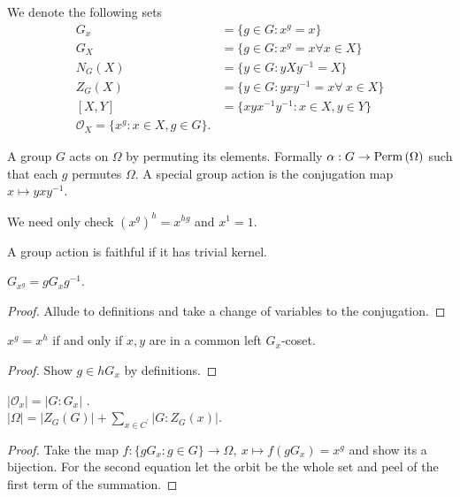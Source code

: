 \begin{definition}
	We denote the following sets
	\begin{align*}
		G_{x} &= \{g \in G :  x^{g} = x  \} \\
		G_{X} &= \{g \in G : x^{g} = x \forall x \in X\}  \\
		N_{G}\left( X \right) &= \{y\in G : yXy^{-1} = X \}  \\
		Z_{G}\left( X \right) &= \{y \in G : yxy^{-1} = x  \forall \ x \in X\}  \\
		\left[ X, Y \right] &= \{xyx^{-1}y^{-1} : x \in X, y \in Y\}  \\
		\mathscr{O}_{X} = \{x^{g} : x \in X, g \in G\}
	.\end{align*}

\end{definition}
\begin{definition}
	A group \(G\) acts on \(\Omega\) by permuting its elements. Formally \(\alpha : G \to \operatorname{Perm} \left( \Omega \right) \) such that each \(g\) permutes \(\Omega\). A special group action is the conjugation map \(x \mapsto yxy^{-1}\).
\end{definition}
\begin{remark}
	We need only check \(\left( x^{g} \right)^{h} = x^{hg} \) and \(x^{1} = 1\).
\end{remark}
\begin{definition}
	A group action is faithful if it has trivial kernel.
\end{definition}
\begin{theorem}
	\(G_{x^{g}} = gG_{x}g^{-1} \).
\end{theorem}
\begin{proof}
	Allude to definitions and take a change of variables to the conjugation.
\end{proof}
\begin{theorem}
	\(x^{g} = x^{h}\) if and only if \(x, y\) are in a common left \(G_{x}\)-coset.
\end{theorem}
\begin{proof}
	Show \(g \in hG_{x}\) by definitions.
\end{proof}
\begin{theorem}
\(\left| \mathscr{O}_{x} \right|  = \left| G : G_{x} \right| \) .\\
\(\left| \Omega \right|  = \left| Z_{G}\left( G \right)  \right|  + \sum_{x \in C^{\prime}}^{} \left| G : Z_{G}\left( x \right)  \right| \).
\end{theorem}
\begin{proof}
	Take the map \(f: \{ gG_{x}: g \in G\} \to \Omega, \ x\mapsto f\left( gG_{x} \right) = x^{g}  \) and show its a bijection. For the second equation let the orbit be the whole set and peel of the first term of the summation.
\end{proof}
